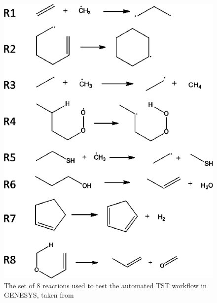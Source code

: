 \documentclass[preprint, 11pt]{elsarticle} %
\begin{document}
\begin{figure}
    \centering
    \includegraphics{genesys_reactions.jpg}
    \caption{The set of 8 reactions used to test the automated TST workflow in GENESYS, taken from \cite{VANDEVIJVER:2018}}
    \label{fig:genesys_reactions}
\end{figure}
\end{document}
